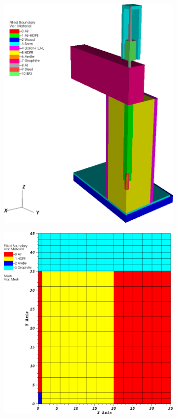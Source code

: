\documentclass[11pt]{article}
\begin{document}
\begin{figure}
\centering
	\begin{subfigure}[b]{0.375\textwidth}
		\centering
		\includegraphics[width=\textwidth]{figures/IM1_configuration_Rev1.png}
		\caption{}
		\label{fig::IM1_layouts_a}
	\end{subfigure}
	\hfill
	\begin{subfigure}[b]{0.375\textwidth}
		\centering
		\includegraphics[width=\textwidth]{figures/2D_IM1_Variant_Layout.png}

\end{subfigure}
\end{figure}
\end{document}
